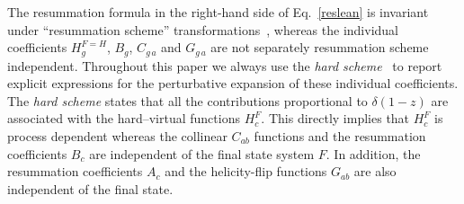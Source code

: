 \documentclass[12pt]{article}
\begin{document}
The resummation formula in the right-hand side of Eq.~\eqref{reslean} is invariant under ``resummation scheme''  transformations~\cite{Catani:2000vq}, whereas the individual coefficients $H_g^{F=H}$, $B_{g}$, $C_{g\, a}$ and $G_{g\, a}$ are not separately resummation scheme independent. Throughout this paper we always use the \textit{hard scheme}~\cite{Catani:2013tia} to report explicit expressions for the perturbative expansion of these individual coefficients. The \textit{hard scheme} states that all the contributions proportional to $\delta(1-z)$ are associated with the hard--virtual functions $H_c^{F}$. This directly implies that $H_c^{F}$ is process dependent whereas the collinear $C_{ab}$ functions and the resummation coefficients $B_{c}$ are independent of the final state system $F$. In addition, the resummation coefficients $A_{c}$ and the helicity-flip functions $G_{ab}$ are also independent of the final state.
\end{document}
